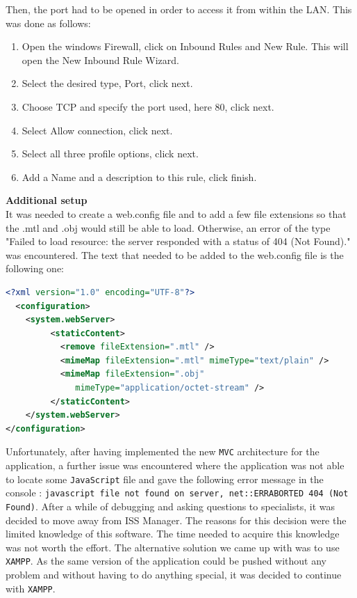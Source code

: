 \documentclass{scrreprt}
\begin{document}
Then, the port had to be opened in order to access it from within the LAN. This was done as follows:
\begin{enumerate}
  \item Open the windows Firewall, click on Inbound Rules and New Rule. This will open the New Inbound Rule Wizard.
  \item Select the desired type, Port, click next.
  \item Choose TCP and specify the port used, here 80, click next.
  \item Select Allow connection, click next.
  \item Select all three profile options, click next.
  \item Add a Name and a description to this rule, click finish.
\end{enumerate}

\textbf{Additional setup}\\

It was needed to create a web.config file and to add a few file extensions so that the .mtl and .obj would still be able to load. 
Otherwise, an error of the type "Failed to load resource: the server responded with a status of 404 (Not Found)." was encountered. 
The text that needed to be added to the web.config file is the following one: 

\begin{lstlisting}[language=XML, basicstyle=\ttfamily\small, backgroundcolor = \color{lightgray}]
<?xml version="1.0" encoding="UTF-8"?>
  <configuration>
    <system.webServer>
         <staticContent>
           <remove fileExtension=".mtl" />
           <mimeMap fileExtension=".mtl" mimeType="text/plain" />
           <mimeMap fileExtension=".obj" 
              mimeType="application/octet-stream" />
         </staticContent>
    </system.webServer>
</configuration>
\end{lstlisting}

Unfortunately, after having implemented the new \texttt{MVC} architecture for the application, a further issue was encountered where the application was not able to locate some \texttt{JavaScript} file and gave the following error message in the console : 
\texttt{javascript file not found on server, net::ERR\textunderscore ABORTED 404 (Not Found)}.  After a while of debugging and asking questions to specialists, 
it was decided to move away from ISS Manager. The reasons for this decision were the limited knowledge of this software. The time needed to acquire this knowledge was not worth the effort. 
The alternative solution we came up with was to use \texttt{XAMPP}. As the same version of the application could be pushed without any problem and without having to do anything special, it was decided to continue with \texttt{XAMPP}.
\end{document}
